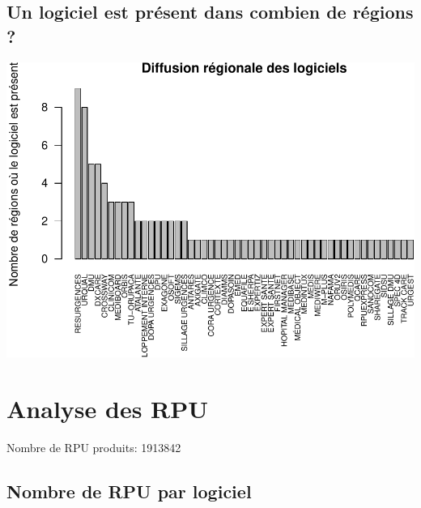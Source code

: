 \documentclass[]{article}
\begin{document}
\subsection{Un logiciel est présent dans combien de régions
?}\label{un-logiciel-est-present-dans-combien-de-regions}

\includegraphics{septembre2015_files/figure-latex/unnamed-chunk-8-1.pdf}

\section{Analyse des RPU}\label{analyse-des-rpu}

Nombre de RPU produits: 1913842

\subsection{Nombre de RPU par
logiciel}\label{nombre-de-rpu-par-logiciel}
\end{document}
